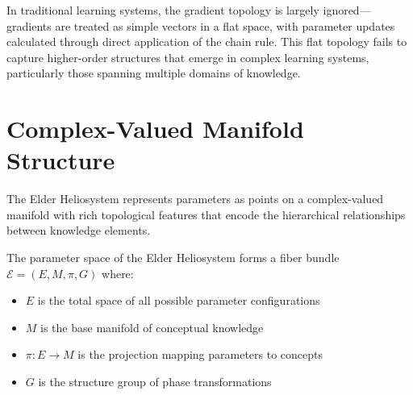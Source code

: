 In traditional learning systems, the gradient topology is largely ignored—gradients are treated as simple vectors in a flat space, with parameter updates calculated through direct application of the chain rule. This flat topology fails to capture higher-order structures that emerge in complex learning systems, particularly those spanning multiple domains of knowledge.

\section{Complex-Valued Manifold Structure}

The Elder Heliosystem represents parameters as points on a complex-valued manifold with rich topological features that encode the hierarchical relationships between knowledge elements.

\begin{theorem}
The parameter space of the Elder Heliosystem forms a fiber bundle $\mathcal{E} = (E, M, \pi, G)$ where:
\begin{itemize}
    \item $E$ is the total space of all possible parameter configurations
    \item $M$ is the base manifold of conceptual knowledge
    \item $\pi: E \rightarrow M$ is the projection mapping parameters to concepts
    \item $G$ is the structure group of phase transformations
\end{itemize}
\end{theorem}

